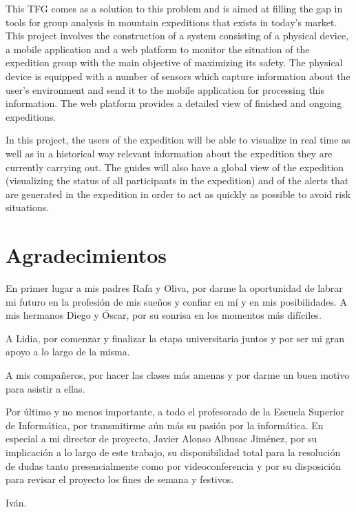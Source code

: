 This \ac{TFG} comes as a solution to this problem and is aimed at filling the gap in tools for group analysis in mountain expeditions that exists in today's market. This project involves the construction of a system consisting of a physical device, a mobile application and a web platform to monitor the situation of the expedition group with the main objective of maximizing its safety. The physical device is equipped with a number of sensors which capture information about the user's environment and send it to the mobile application for processing this information. The web platform provides a detailed view of finished and ongoing expeditions.

In this project, the users of the expedition will be able to visualize in real time as well as in a historical way relevant information about the expedition they are currently carrying out. The guides will also have a global view of the expedition (visualizing the status of all participants in the expedition) and of the alerts that are generated in the expedition in order to act as quickly as possible to avoid risk situations.

\chapter{Agradecimientos}

En primer lugar a mis padres Rafa y Oliva, por darme la oportunidad de labrar mi futuro en la profesión de mis sueños y confiar en mí y en mis posibilidades. A mis hermanos Diego y Óscar, por su sonrisa en los momentos más difíciles.

A Lidia, por comenzar y finalizar la etapa universitaria juntos y por ser mi gran apoyo a lo largo de la misma.

A mis compañeros, por hacer las clases más amenas y por darme un buen motivo para asistir a ellas.

Por último y no menos importante, a todo el profesorado de la Escuela Superior de Informática, por transmitirme aún más su pasión por la informática. En especial a mi director de proyecto, Javier Alonso Albusac Jiménez, por su implicación a lo largo de este trabajo, su disponibilidad total para la resolución de dudas tanto presencialmente como por videoconferencia y por su disposición para revisar el proyecto los fines de semana y festivos.

\begin{flushright}
Iván.
\end{flushright}